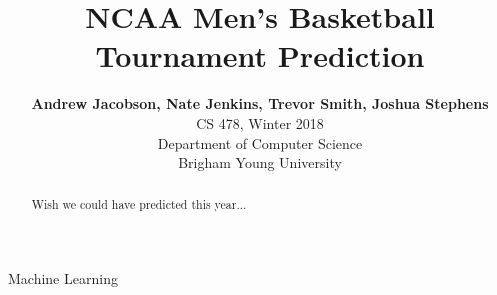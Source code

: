 \documentclass[conference,compsoc]{IEEEtran}
\begin{document}
\title{NCAA Men's Basketball Tournament Prediction}

\author{
  \textbf{Andrew Jacobson, Nate Jenkins, Trevor Smith, Joshua Stephens}\\
  CS 478, Winter 2018\\
  Department of Computer Science\\
  Brigham Young University\\
}
\maketitle

\thispagestyle{plain}
\pagestyle{plain}


\begin{abstract}
Wish we could have predicted this year...
\end{abstract}

\begin{IEEEkeywords}
Machine Learning
\end{IEEEkeywords}













\end{document}
